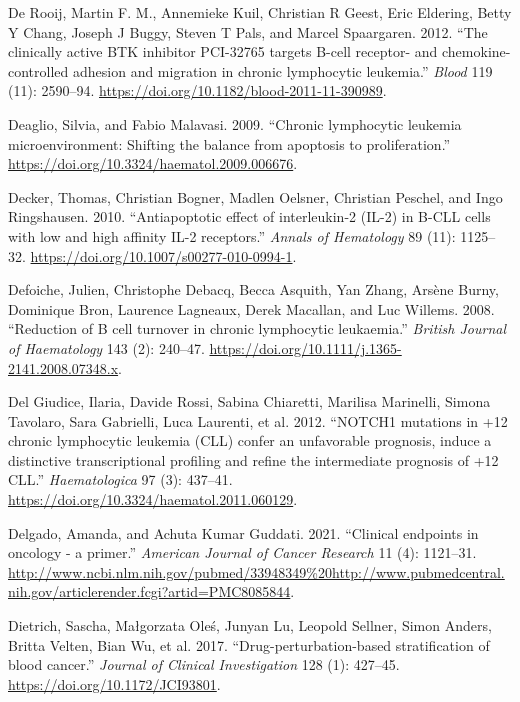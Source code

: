 \documentclass[11pt, a4paper, twosided]{book}
\newenvironment{CSLReferences}%
  {}%
  {\par}
\begin{document}
\begin{CSLReferences}{1}{0}
\leavevmode{}%
De Rooij, Martin F. M., Annemieke Kuil, Christian R Geest, Eric Eldering, Betty Y Chang, Joseph J Buggy, Steven T Pals, and Marcel Spaargaren. 2012. {``{The clinically active BTK inhibitor PCI-32765 targets B-cell receptor- and chemokine-controlled adhesion and migration in chronic lymphocytic leukemia}.''} \emph{Blood} 119 (11): 2590--94. \url{https://doi.org/10.1182/blood-2011-11-390989}.

\leavevmode{}%
Deaglio, Silvia, and Fabio Malavasi. 2009. {``{Chronic lymphocytic leukemia microenvironment: Shifting the balance from apoptosis to proliferation}.''} \url{https://doi.org/10.3324/haematol.2009.006676}.

\leavevmode{}%
Decker, Thomas, Christian Bogner, Madlen Oelsner, Christian Peschel, and Ingo Ringshausen. 2010. {``{Antiapoptotic effect of interleukin-2 (IL-2) in B-CLL cells with low and high affinity IL-2 receptors}.''} \emph{Annals of Hematology} 89 (11): 1125--32. \url{https://doi.org/10.1007/s00277-010-0994-1}.

\leavevmode{}%
Defoiche, Julien, Christophe Debacq, Becca Asquith, Yan Zhang, Arsène Burny, Dominique Bron, Laurence Lagneaux, Derek Macallan, and Luc Willems. 2008. {``{Reduction of B cell turnover in chronic lymphocytic leukaemia}.''} \emph{British Journal of Haematology} 143 (2): 240--47. \url{https://doi.org/10.1111/j.1365-2141.2008.07348.x}.

\leavevmode{}%
Del Giudice, Ilaria, Davide Rossi, Sabina Chiaretti, Marilisa Marinelli, Simona Tavolaro, Sara Gabrielli, Luca Laurenti, et al. 2012. {``{NOTCH1 mutations in +12 chronic lymphocytic leukemia (CLL) confer an unfavorable prognosis, induce a distinctive transcriptional profiling and refine the intermediate prognosis of +12 CLL}.''} \emph{Haematologica} 97 (3): 437--41. \url{https://doi.org/10.3324/haematol.2011.060129}.

\leavevmode{}%
Delgado, Amanda, and Achuta Kumar Guddati. 2021. {``{Clinical endpoints in oncology - a primer.}''} \emph{American Journal of Cancer Research} 11 (4): 1121--31. \url{http://www.ncbi.nlm.nih.gov/pubmed/33948349\%20http://www.pubmedcentral.nih.gov/articlerender.fcgi?artid=PMC8085844}.

\leavevmode{}%
Dietrich, Sascha, Małgorzata Oleś, Junyan Lu, Leopold Sellner, Simon Anders, Britta Velten, Bian Wu, et al. 2017. {``{Drug-perturbation-based stratification of blood cancer}.''} \emph{Journal of Clinical Investigation} 128 (1): 427--45. \url{https://doi.org/10.1172/JCI93801}.


\end{CSLReferences}
\end{document}
